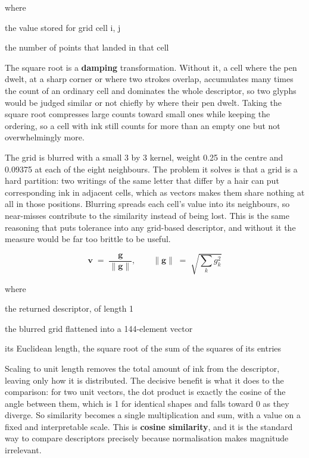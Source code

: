 \noindent where
\begin{description}[leftmargin=2.4em,style=nextline,font=\normalfont\ttfamily]\setlength\itemsep{1pt}
  \item[{$G[i,j]$}] \normalfont the value stored for grid cell i, j
  \item[{$|\{\cdot\}|$}] \normalfont the number of points that landed in that cell
\end{description}
The square root is a \textbf{damping} transformation. Without it, a cell where the pen dwelt, at a sharp corner or where two strokes overlap, accumulates many times the count of an ordinary cell and dominates the whole descriptor, so two glyphs would be judged similar or not chiefly by where their pen dwelt. Taking the square root compresses large counts toward small ones while keeping the ordering, so a cell with ink still counts for more than an empty one but not overwhelmingly more.


The grid is blurred with a small 3 by 3 kernel, weight 0.25 in the centre and 0.09375 at each of the eight neighbours. The problem it solves is that a grid is a hard partition: two writings of the same letter that differ by a hair can put corresponding ink in adjacent cells, which as vectors makes them share nothing at all in those positions. Blurring spreads each cell's value into its neighbours, so near-misses contribute to the similarity instead of being lost. This is the same reasoning that puts tolerance into any grid-based descriptor, and without it the measure would be far too brittle to be useful.



\begin{equation}
\mathbf{v} \;=\; \frac{\mathbf{g}}{\|\mathbf{g}\|}, \qquad \|\mathbf{g}\| \;=\; \sqrt{\textstyle\sum_{k} g_k^2}
\end{equation}

\noindent where
\begin{description}[leftmargin=2.4em,style=nextline,font=\normalfont\ttfamily]\setlength\itemsep{1pt}
  \item[{$\mathbf{v}$}] \normalfont the returned descriptor, of length 1
  \item[{$\mathbf{g}$}] \normalfont the blurred grid flattened into a 144-element vector
  \item[{$\|\mathbf{g}\|$}] \normalfont its Euclidean length, the square root of the sum of the squares of its entries
\end{description}
Scaling to unit length removes the total amount of ink from the descriptor, leaving only how it is distributed. The decisive benefit is what it does to the comparison: for two unit vectors, the dot product is exactly the cosine of the angle between them, which is 1 for identical shapes and falls toward 0 as they diverge. So similarity becomes a single multiplication and sum, with a value on a fixed and interpretable scale. This is \textbf{cosine similarity}, and it is the standard way to compare descriptors precisely because normalisation makes magnitude irrelevant.


